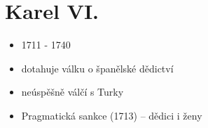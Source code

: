 \documentclass{article}
\begin{document}
\section{Karel VI.}
\begin{itemize}
  \item 1711 - 1740
  \item dotahuje válku o španělské dědictví
  \item neúspěšně válčí s Turky
  \item Pragmatická sankce (1713) -- dědici i ženy
\end{itemize}
\end{document}
